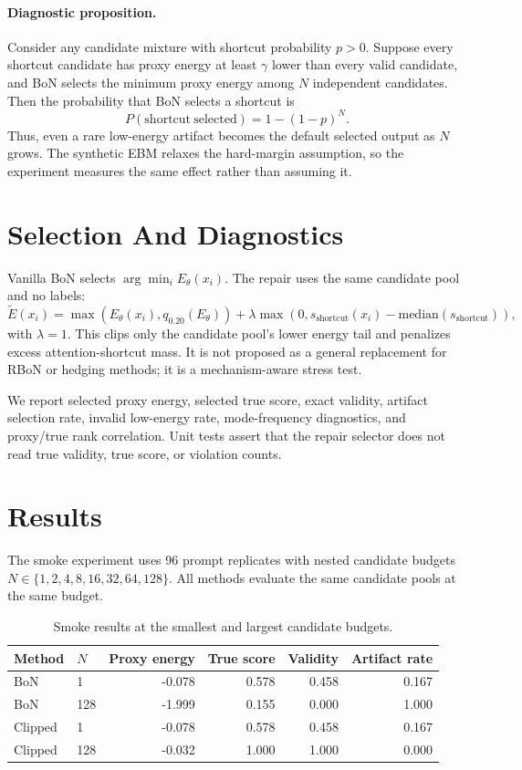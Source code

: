 \documentclass{article}
\begin{document}
\paragraph{Diagnostic proposition.}
Consider any candidate mixture with shortcut probability $p>0$. Suppose every
shortcut candidate has proxy energy at least $\gamma$ lower than every valid
candidate, and BoN selects the minimum proxy energy among $N$ independent
candidates. Then the probability that BoN selects a shortcut is
\begin{equation}
  P(\mathrm{shortcut\ selected}) = 1-(1-p)^N.
\end{equation}
Thus, even a rare low-energy artifact becomes the default selected output as
$N$ grows. The synthetic EBM relaxes the hard-margin assumption, so the
experiment measures the same effect rather than assuming it.

\section{Selection And Diagnostics}

Vanilla BoN selects $\arg\min_i E_\theta(x_i)$. The repair uses the same
candidate pool and no labels:
\begin{equation}
  \tilde E(x_i)=\max(E_\theta(x_i), q_{0.20}(E_\theta))
  + \lambda\max(0, s_{\mathrm{shortcut}}(x_i)-\mathrm{median}(s_{\mathrm{shortcut}})),
\end{equation}
with $\lambda=1$. This clips only the candidate pool's lower energy tail and
penalizes excess attention-shortcut mass. It is not proposed as a general
replacement for RBoN or hedging methods; it is a mechanism-aware stress test.

We report selected proxy energy, selected true score, exact validity, artifact
selection rate, invalid low-energy rate, mode-frequency diagnostics, and
proxy/true rank correlation. Unit tests assert that the repair selector does not
read true validity, true score, or violation counts.

\section{Results}

The smoke experiment uses 96 prompt replicates with nested candidate budgets
$N\in\{1,2,4,8,16,32,64,128\}$. All methods evaluate the same candidate pools at
the same budget.

\begin{table}[h]
\centering
\caption{Smoke results at the smallest and largest candidate budgets.}
\begin{tabular}{llrrrr}
\toprule
Method & $N$ & Proxy energy & True score & Validity & Artifact rate \\
\midrule
BoN & 1 & -0.078 & 0.578 & 0.458 & 0.167 \\
BoN & 128 & -1.999 & 0.155 & 0.000 & 1.000 \\
Clipped & 1 & -0.078 & 0.578 & 0.458 & 0.167 \\
Clipped & 128 & -0.032 & 1.000 & 1.000 & 0.000 \\
\bottomrule
\end{tabular}
\label{tab:main}
\end{table}
\end{document}

